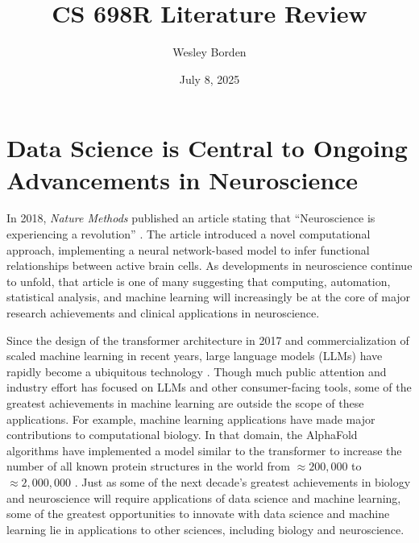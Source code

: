\documentclass[11pt]{article}
\title{CS 698R Literature Review}
\author{Wesley Borden}
\date{July 8, 2025}
\newcommand{\sectionwithindent}[1]{
    \section*{#1}
    \hspace{\parindent} %
}
\begin{document}

\sectionwithindent{Data Science is Central to Ongoing Advancements in Neuroscience} %
In 2018, \textit{Nature Methods} published an article stating that ``Neuroscience is experiencing a revolution'' \cite{pandarinath2018autoencoders}. The article introduced a novel computational approach, implementing a neural network-based model to infer functional relationships between active brain cells. As developments in neuroscience continue to unfold, that article is one of many suggesting that computing, automation, statistical analysis, and machine learning will increasingly be at the core of major research achievements and clinical applications in neuroscience.

Since the design of the transformer architecture in 2017 \cite{vaswani2023attentionneed} and commercialization of scaled machine learning in recent years, large language models (LLMs) have rapidly become a ubiquitous technology \cite{wikipedia2025llm}. Though much public attention and industry effort has focused on LLMs and other consumer-facing tools, some of the greatest achievements in machine learning are outside the scope of these applications. For example, machine learning applications have made major contributions to computational biology. In that domain, the AlphaFold algorithms have implemented a model similar to the transformer to increase the number of all known protein structures in the world from $\approx200,000$ to $\approx2,000,000$ \cite{jumper2021alphafold, wikipedia2025alphafold, wikipedia2025pdb}. Just as some of the next decade's greatest achievements in biology and neuroscience will require applications of data science and machine learning, some of the greatest opportunities to innovate with data science and machine learning lie in applications to other sciences, including biology and neuroscience.
\end{document}
